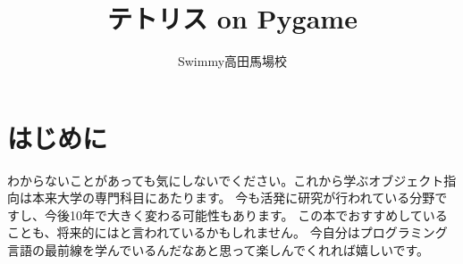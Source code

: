 \documentclass[12pt, a4paper, uplatex]{jsbook}
\title{テトリス on Pygame}
\author{Swimmy高田馬場校}
\begin{document}
\maketitle
\tableofcontents
\chapter{はじめに}
わからないことがあっても気にしないでください。これから学ぶオブジェクト指向は本来大学の専門科目にあたります。
今も活発に研究が行われている分野ですし、今後10年で大きく変わる可能性もあります。
この本でおすすめしていることも、将来的にはと言われているかもしれません。
今自分はプログラミング言語の最前線を学んでいるんだなあと思って楽しんでくれれば嬉しいです。



















%
\end{document}
